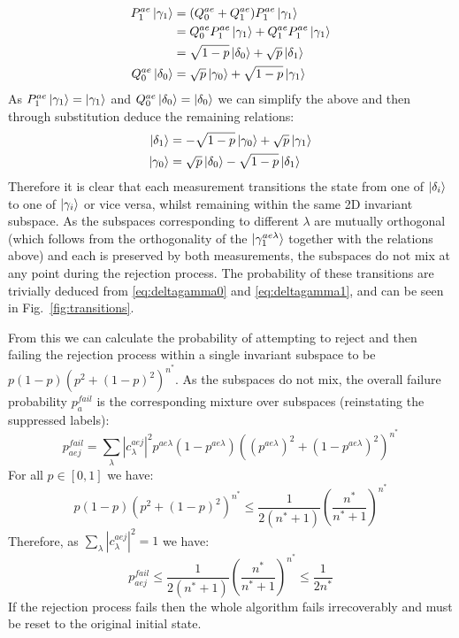 \documentclass[aps,floatfix,10pt,amssymb,amsfont,amsmath,superscriptaddress,float,nofootinbib,longbibliography,nobalancelastpage,twocolumn]{revtex4-2}
\begin{document}
\begin{align}
\begin{split}
\label{eq:deltagamma0}
    P^{ae}_1 \ket{\gamma_1} &= (Q^{ae}_0+Q^{ae}_1)P^{ae}_1 \ket{\gamma_1}\\
    &= Q^{ae}_0P^{ae}_1 \ket{\gamma_1}+Q^{ae}_1P^{ae}_1 \ket{\gamma_1}\\
    &= \sqrt{1-p} \ket{\delta_0} + \sqrt{p}\ket{\delta_1}\\
    Q^{ae}_0\ket{\delta_0} &= \sqrt{p} \ket{\gamma_0} + \sqrt{1-p} \ket{\gamma_1}
\end{split}
\end{align}
As $P^{ae}_1 \ket{\gamma_1} = \ket{\gamma_1}$ and $Q^{ae}_0\ket{\delta_0} = \ket{\delta_0}$ we can simplify the above and then through substitution deduce the remaining relations:
\begin{align}
\begin{split}
\label{eq:deltagamma1}
        \ket{\delta_1} &= -\sqrt{1-p} \ket{\gamma_0} + \sqrt{p} \ket{\gamma_1}\\
    \ket{\gamma_0} &= \sqrt{p} \ket{\delta_0} - \sqrt{1-p}\ket{\delta_1}
\end{split}
\end{align}
Therefore it is clear that each measurement transitions the state from one of $\ket{\delta_i}$ to one of $\ket{\gamma_i}$ or vice versa, whilst remaining within the same 2D invariant subspace. As the subspaces corresponding to different $\lambda$ are mutually orthogonal (which follows from the orthogonality of the $\ket{\gamma^{ae\lambda}_1}$ together with the relations above) and each is preserved by both measurements, the subspaces do not mix at any point during the rejection process. The probability of these transitions are trivially deduced from \eqref{eq:deltagamma0} and \eqref{eq:deltagamma1}, and can be seen in Fig.~\ref{fig:transitions}.


From this we can calculate the probability of attempting to reject and then failing the rejection process within a single invariant subspace to be $p(1-p)(p^2 +(1-p)^2)^{n^*}$. As the subspaces do not mix, the overall failure probability $p_a^{fail}$ is the corresponding mixture over subspaces (reinstating the suppressed labels):
\begin{equation}
   p_{aej}^{fail} =  \sum_{\lambda}|c^{aej}_{\lambda}|^2p^{ae\lambda}(1-p^{ae\lambda})((p^{ae\lambda})^2 +(1-p^{ae\lambda})^2)^{n^*}
\end{equation}
For all $p \in [0,1]$ we have: 
\begin{equation}
    p(1-p)(p^2 +(1-p)^2)^{n^*} \leq \frac{1}{2(n^*+1)} \left(\frac{n^*}{n^*+1}\right)^{n^*}
\end{equation}
Therefore, as $\sum_{\lambda}|c^{aej}_{\lambda}|^2=1$ we have:
\begin{equation}
    \label{eq:probabilty_of_rejection}
   p_{aej}^{fail} \leq \frac{1}{2(n^*+1)} \left(\frac{n^*}{n^*+1}\right)^{n^*} \leq \frac{1}{2n^*}
\end{equation}
If the rejection process fails then the whole algorithm fails irrecoverably and must be reset to the original initial state.
\end{document}
